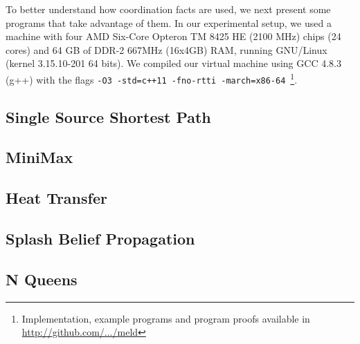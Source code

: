 
To better understand how coordination facts are used, we next present some programs that
take advantage of them. In our experimental setup, we used a machine with
four AMD Six-Core Opteron TM 8425 HE (2100 MHz) chips (24 cores) and 64 GB of
DDR-2 667MHz (16x4GB) RAM, running GNU/Linux (kernel 3.15.10-201 64 bits).
We compiled our virtual machine using GCC 4.8.3 (g++) with the flags
\texttt{-O3 -std=c++11 -fno-rtti -march=x86-64}~\footnote{Implementation,
   example programs and program proofs available in \url{http://github.com/.../meld}}.

\subsection{Single Source Shortest Path}


\subsection{MiniMax}


\subsection{Heat Transfer}


\subsection{Splash Belief Propagation}


\subsection{N Queens}

